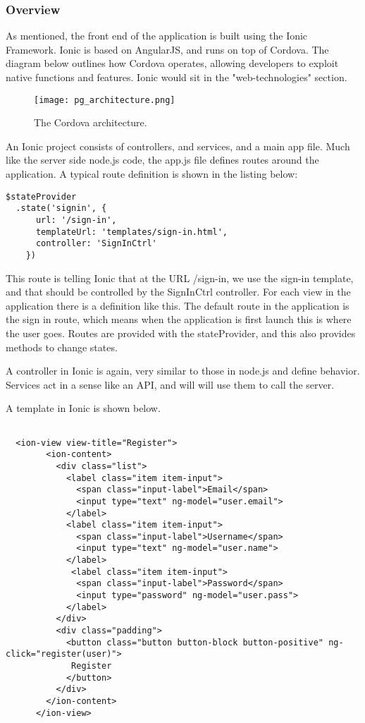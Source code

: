 \documentclass[a4paper]{article}
\begin{document}
\subsubsection{Overview}
As mentioned, the front end of the application is built using the Ionic Framework. Ionic is based on AngularJS, and runs on top of Cordova. The diagram below outlines how Cordova operates, allowing developers to exploit native functions and features. Ionic would sit in the "web-technologies" section.
\begin{figure}[H]
  \caption{The Cordova architecture.}
  \centering
    \texttt{[image: pg\_architecture.png]}
\end{figure}

An Ionic project consists of controllers, and services, and a main app file. Much like the server side node.js code, the app.js file defines routes around the application. A typical route definition is shown in the listing below:
\begin{lstlisting}[label=A Route in Ionic,caption=A Route in Ionic]
$stateProvider
  .state('signin', {
      url: '/sign-in',
      templateUrl: 'templates/sign-in.html',
      controller: 'SignInCtrl'
    })
\end{lstlisting}

This route is telling Ionic that at the URL /sign-in, we use the sign-in template, and that should be controlled by the SignInCtrl controller.
 For each view in the application there is a definition like this. The default route in the application is the sign in route, which means when the application is first launch this is where the user goes.
 Routes are provided with the stateProvider, and this also provides methods to change states.
 
 A controller in Ionic is again, very similar to those in node.js and define behavior. Services act in a sense like an API, and will will use them to call the server.
 
 A template in Ionic is shown below.
 \begin{lstlisting}[label=The registration screen template,caption=The registration screen]

  <ion-view view-title="Register">
        <ion-content>
          <div class="list">
            <label class="item item-input">
              <span class="input-label">Email</span>
              <input type="text" ng-model="user.email">
            </label>
            <label class="item item-input">
              <span class="input-label">Username</span>
              <input type="text" ng-model="user.name">
            </label>
             <label class="item item-input">
              <span class="input-label">Password</span>
              <input type="password" ng-model="user.pass">
            </label>
          </div>
          <div class="padding">
            <button class="button button-block button-positive" ng-click="register(user)">
             Register
            </button>
          </div>
        </ion-content>
      </ion-view>
\end{lstlisting}
\end{document}
